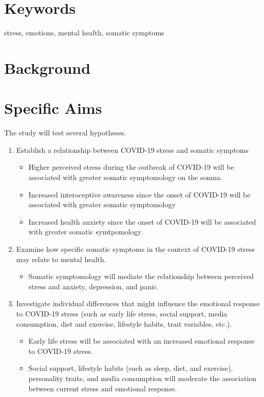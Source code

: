\documentclass[]{book}
\providecommand{\tightlist}{%
  \setlength{\itemsep}{0pt}\setlength{\parskip}{0pt}}
\begin{document}
\hypertarget{keywords}{%
\section{Keywords}\label{keywords}}

stress, emotions, mental health, somatic symptoms

\hypertarget{background}{%
\section{Background}\label{background}}

\hypertarget{specific-aims}{%
\section{Specific Aims}\label{specific-aims}}

The study will test several hypotheses.

\begin{enumerate}
\def\labelenumi{\arabic{enumi}.}
\tightlist
\item
  Establish a relationship between COVID-19 stress and somatic symptoms

  \begin{itemize}
  \tightlist
  \item
    Higher perceived stress during the outbreak of COVID-19 will be associated with greater somatic symptomology on the somna.
  \item
    Increased interoceptive awareness since the onset of COVID-19 will be associated with greater somatic symptomology
  \item
    Increased health anxiety since the onset of COVID-19 will be associated with greater somatic symtpomology
  \end{itemize}
\item
  Examine how specific somatic symptoms in the context of COVID-19 stress may relate to mental health.

  \begin{itemize}
  \tightlist
  \item
    Somatic symptomology will mediate the relationship between perceived stress and anxiety, depression, and panic.
  \end{itemize}
\item
  Investigate individual differences that might influence the emotional response to COVID-19 stress (such as early life stress, social support, media consumption, diet and exercise, lifestyle habits, trait variables, etc.).

  \begin{itemize}
  \tightlist
  \item
    Early life stress will be associated with an increased emotional response to COVID-19 stress.
  \item
    Social support, lifestyle habits (such as sleep, diet, and exercise), personality traits, and media consumption will moderate the association between current stress and emotional response.
  \end{itemize}
\end{enumerate}
\end{document}
